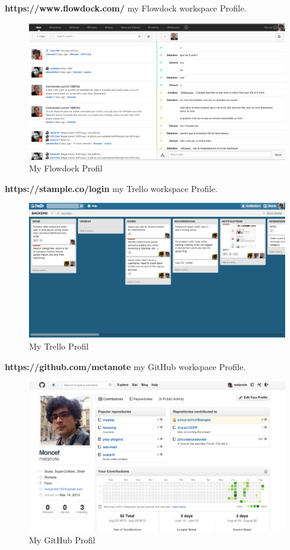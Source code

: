\newpage
\textbf{https://www.flowdock.com/} my Flowdock workspace Profile.
\begin{figure}[H]
        \centering
                \centering
                \includegraphics[width=\textwidth]{Flowdock.png}
               \caption{My Flowdock Profil}

\end{figure}
\textbf{https://stample.co/login} my Trello workspace Profile.
\begin{figure}[H]
        \centering
                \centering
                \includegraphics[width=\textwidth]{trello.png}
               	\caption{My Trello Profil}

\end{figure}
\newpage
\textbf{https://github.com/metanote} my GitHub workspace Profile.
\begin{figure}[H]
        \centering
                \centering
                \includegraphics[width=\textwidth]{gitProfile.png}
               \caption{My GitHub Profil}

\end{figure}
